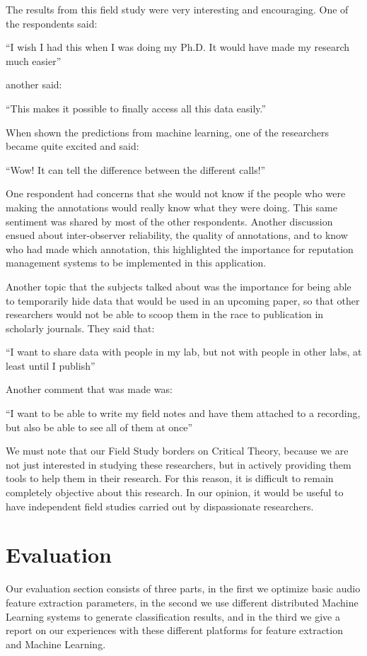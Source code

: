 The results from this field study were very interesting and
encouraging.  One of the respondents said:

``I wish I had this when I was doing my Ph.D.  It would have made my
research much easier''

another said:

``This makes it possible to finally access all this data easily.''

When shown the predictions from machine learning, one of the
researchers became quite excited and said:

``Wow!  It can tell the difference between the different calls!''

One respondent had concerns that she would not know if the people who
were making the annotations would really know what they were doing.
This same sentiment was shared by most of the other respondents.
Another discussion ensued about inter-observer reliability, the quality
of annotations, and to know who had made which annotation, this
highlighted the importance for reputation management systems to be
implemented in this application.

Another topic that the subjects talked about was the importance for
being able to temporarily hide data that would be used in an upcoming
paper, so that other researchers would not be able to scoop them in
the race to publication in scholarly journals.  They said that:

``I want to share data with people in my lab, but not with people in
other labs, at least until I publish''

Another comment that was made was:

``I want to be able to write my field notes and have them attached to
a recording, but also be able to see all of them at once''

We must note that our Field Study borders on Critical Theory, because
we are not just interested in studying these researchers, but in
actively providing them tools to help them in their research.  For
this reason, it is difficult to remain completely objective about this
research.  In our opinion, it would be useful to have independent
field studies carried out by dispassionate researchers.


\section{Evaluation}

Our evaluation section consists of three parts, in the first we
optimize basic audio feature extraction parameters, in the second we
use different distributed Machine Learning systems to generate
classification results, and in the third we give a report on our
experiences with these different platforms for feature extraction and
Machine Learning.

